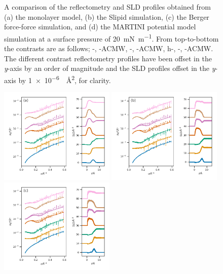\documentclass[amsmath,amssymb,superscriptaddress]{revtex4-1}
\begin{document}
\begin{figure}
 \caption{A comparison of the reflectometry and SLD profiles obtained from (a) the monolayer model, (b) the Slipid simulation, (c) the Berger force-force simulation, and (d) the MARTINI potential model simulation at a surface pressure of \SI{20}{\milli\newton\per\meter}. From top-to-bottom the contrasts are as follows; -, -ACMW, -, -ACMW, h-, -, -ACMW. The different contrast reflectometry profiles have been offset in the \emph{y}-axis by an order of magnitude and the SLD profiles offset in the \emph{y}-axis by \SI{1e-6}{\per\square\angstrom}, for clarity.}
 \label{fig:sp20}
\end{figure}
%
%
\begin{figure}
 \centering
 \includegraphics[width=0.49\textwidth]{trad_40}
 \includegraphics[width=0.49\textwidth]{sim_slipids_40} \\
 \includegraphics[width=0.49\textwidth]{sim_berger_40}

\end{figure}
\end{document}
